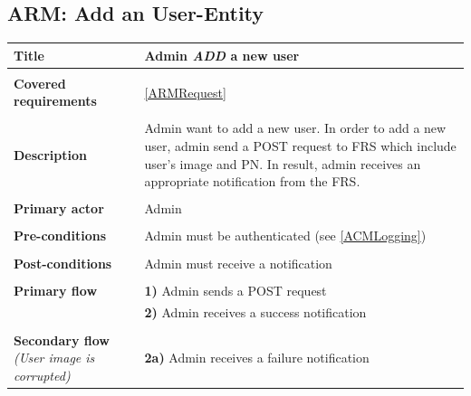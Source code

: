 \documentclass[a4paper,11pt]{article}
\begin{document}
\subsection{ARM: Add an User-Entity}

\begin{tabular}{|p{3.5cm}|p{11.5cm}|} \hline
    \textbf{Title} &   Admin \emph{ADD} a new user

    \\ \hline \rowcolor{Gray} & \\ \hline

    \textbf{Covered requirements} &  \ref{ARMRequest}

    \\ \hline \rowcolor{Gray} & \\ \hline
    
    \textbf{Description} &  Admin want to add a new user. In order to add a new user, admin send a POST request to FRS which include user's image and PN. In result, admin receives an appropriate notification from the FRS.
        
    \\ \hline \rowcolor{Gray} & \\ \hline

    \textbf{Primary actor} & Admin

    \\ \hline \rowcolor{Gray} & \\ \hline

    \textbf{Pre-conditions} &   Admin must be authenticated (see \ref{ACMLogging})

    \\ \hline \rowcolor{Gray} & \\ \hline

    \textbf{Post-conditions} &   Admin must receive a notification
        
    \\ \hline \rowcolor{Gray} & \\ \hline 
         
    \textbf{Primary flow} &
    \textbf{1)} Admin sends a POST request \\&
    \textbf{2)} Admin receives a success notification
        
    \\ \hline \rowcolor{Gray} & \\ \hline 
         
    \textbf{Secondary flow} \emph{(User image is corrupted)} & 
    \textbf{2a)} Admin receives a failure notification
     

\end{tabular}
\end{document}
